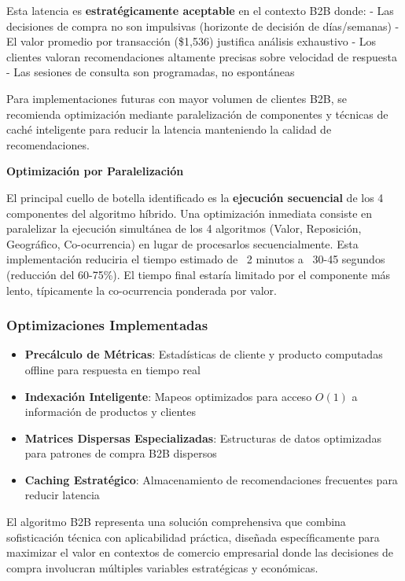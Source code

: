\documentclass[twocolumn]{article}
\begin{document}
Esta latencia es \textbf{estratégicamente aceptable} en el contexto B2B donde:
- Las decisiones de compra no son impulsivas (horizonte de decisión de días/semanas)
- El valor promedio por transacción (\$1,536) justifica análisis exhaustivo
- Los clientes valoran recomendaciones altamente precisas sobre velocidad de respuesta
- Las sesiones de consulta son programadas, no espontáneas

Para implementaciones futuras con mayor volumen de clientes B2B, se recomienda optimización mediante paralelización de componentes y técnicas de caché inteligente para reducir la latencia manteniendo la calidad de recomendaciones.

\textbf{Optimización por Paralelización}

El principal cuello de botella identificado es la \textbf{ejecución secuencial} de los 4 componentes del algoritmo híbrido. Una optimización inmediata consiste en paralelizar la ejecución simultánea de los 4 algoritmos (Valor, Reposición, Geográfico, Co-ocurrencia) en lugar de procesarlos secuencialmente. Esta implementación reduciria el tiempo estimado de ~2 minutos a ~30-45 segundos (reducción del 60-75\%). El tiempo final estaría limitado por el componente más lento, típicamente la co-ocurrencia ponderada por valor.

\subsubsection{Optimizaciones Implementadas}

\begin{itemize}
    \item \textbf{Precálculo de Métricas}: Estadísticas de cliente y producto computadas offline para respuesta en tiempo real
    \item \textbf{Indexación Inteligente}: Mapeos optimizados para acceso \(O(1)\) a información de productos y clientes
    \item \textbf{Matrices Dispersas Especializadas}: Estructuras de datos optimizadas para patrones de compra B2B dispersos
    \item \textbf{Caching Estratégico}: Almacenamiento de recomendaciones frecuentes para reducir latencia
\end{itemize}

El algoritmo B2B representa una solución comprehensiva que combina sofisticación técnica con aplicabilidad práctica, diseñada específicamente para maximizar el valor en contextos de comercio empresarial donde las decisiones de compra involucran múltiples variables estratégicas y económicas.
\end{document}
